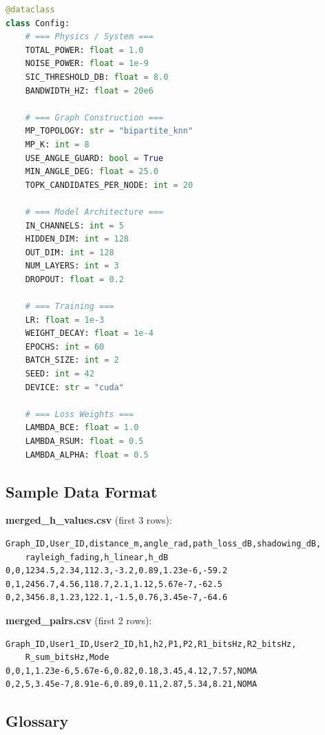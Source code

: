 \documentclass[12pt,a4paper]{article}
\begin{document}
\begin{lstlisting}[language=Python]
@dataclass
class Config:
    # === Physics / System ===
    TOTAL_POWER: float = 1.0
    NOISE_POWER: float = 1e-9
    SIC_THRESHOLD_DB: float = 8.0
    BANDWIDTH_HZ: float = 20e6
    
    # === Graph Construction ===
    MP_TOPOLOGY: str = "bipartite_knn"
    MP_K: int = 8
    USE_ANGLE_GUARD: bool = True
    MIN_ANGLE_DEG: float = 25.0
    TOPK_CANDIDATES_PER_NODE: int = 20
    
    # === Model Architecture ===
    IN_CHANNELS: int = 5
    HIDDEN_DIM: int = 128
    OUT_DIM: int = 128
    NUM_LAYERS: int = 3
    DROPOUT: float = 0.2
    
    # === Training ===
    LR: float = 1e-3
    WEIGHT_DECAY: float = 1e-4
    EPOCHS: int = 60
    BATCH_SIZE: int = 2
    SEED: int = 42
    DEVICE: str = "cuda"
    
    # === Loss Weights ===
    LAMBDA_BCE: float = 1.0
    LAMBDA_RSUM: float = 0.5
    LAMBDA_ALPHA: float = 0.5
\end{lstlisting}

\subsection{Sample Data Format}

\textbf{merged\_h\_values.csv} (first 3 rows):
\begin{verbatim}
Graph_ID,User_ID,distance_m,angle_rad,path_loss_dB,shadowing_dB,
    rayleigh_fading,h_linear,h_dB
0,0,1234.5,2.34,112.3,-3.2,0.89,1.23e-6,-59.2
0,1,2456.7,4.56,118.7,2.1,1.12,5.67e-7,-62.5
0,2,3456.8,1.23,122.1,-1.5,0.76,3.45e-7,-64.6
\end{verbatim}

\textbf{merged\_pairs.csv} (first 2 rows):
\begin{verbatim}
Graph_ID,User1_ID,User2_ID,h1,h2,P1,P2,R1_bitsHz,R2_bitsHz,
    R_sum_bitsHz,Mode
0,0,1,1.23e-6,5.67e-6,0.82,0.18,3.45,4.12,7.57,NOMA
0,2,5,3.45e-7,8.91e-6,0.89,0.11,2.87,5.34,8.21,NOMA
\end{verbatim}

\subsection{Glossary}
\end{document}
